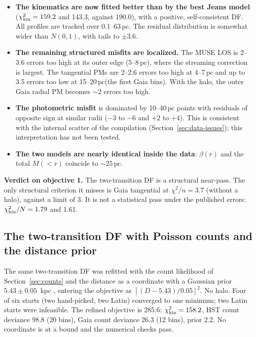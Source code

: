 \documentclass[11pt,a4paper]{article}
\newcommand{\pc}{\ensuremath{\,\mathrm{pc}}\xspace}
\newcommand{\chikin}{\ensuremath{\chi^2_{\rm kin}}\xspace}
\begin{document}
\begin{itemize}
\item \textbf{The kinematics are now fitted better than by the best Jeans
  model} ($\chikin=159.2$ and 143.3, against 190.0), with a positive,
  self-consistent DF. All profiles are tracked over 0.1--63\pc. The residual
  distribution is somewhat wider than $N(0,1)$, with tails to $\pm3.6$.
\item \textbf{The remaining structured misfits are localized.} The MUSE LOS
  is 2--3.6 errors too high at its outer edge (5--8\pc), where the streaming
  correction is largest. The tangential PMs are 2--2.6 errors too high at
  4--7\pc and up to 3.5 errors too low at 15--20\pc (the first Gaia bins).
  With the halo, the outer Gaia radial PM becomes $\sim2$ errors too high.
\item \textbf{The photometric misfit} is dominated by 10--40\pc points with
  residuals of opposite sign at similar radii ($-3$ to $-6$ and $+2$ to $+4$).
  This is consistent with the internal scatter of the compilation
  (Section~\ref{sec:data-issues}); this interpretation has not been tested.
\item \textbf{The two models are nearly identical inside the data}: $\beta(r)$
  and the total $M(<r)$ coincide to $\sim25\pc$.
\end{itemize}

\textbf{Verdict on objective 1.} The two-transition DF is a structural
near-pass. The only structural criterion it misses is Gaia tangential at
$\chi^2/n=3.7$ (without a halo), against a limit of 3. It is not a
statistical pass under the published errors: $\chikin/N=1.79$ and 1.61.

\subsection{The two-transition DF with Poisson counts and the distance prior}
\label{sec:counts-fit}

The same two-transition DF was refitted with the count likelihood of
Section~\ref{sec:counts} and the distance as a coordinate with a Gaussian
prior $5.43\pm0.05$~kpc \citep{2021MNRAS.505.5957B}, entering the objective
as $[(D-5.43)/0.05]^2$. No halo. Four of six starts (two hand-picked, two
Latin) converged to one minimum; two Latin starts were infeasible. The
refined objective is 285.6: $\chikin=158.2$, HST count deviance 98.8 (20
bins), Gaia count deviance 26.3 (12 bins), prior 2.2. No coordinate is at a
bound and the numerical checks pass.
\end{document}
